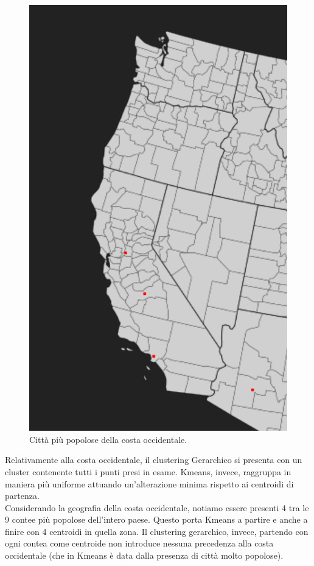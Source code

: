 \documentclass{article}
\begin{document}
\begin{figure}
	\vspace*{-0.5cm}
	\centering
	\includegraphics[width=1.0\linewidth]{figures/costa_bis}
	\caption*{Città più popolose della costa occidentale.}
\end{figure}
Relativamente alla costa occidentale, il clustering Gerarchico si presenta con un cluster contenente tutti i punti presi in esame. Kmeans, invece, raggruppa in maniera più uniforme attuando un'alterazione minima rispetto ai centroidi di partenza.\\
Considerando la geografia della costa occidentale, notiamo essere presenti 4 tra le 9 contee più popolose dell'intero paese.
Questo porta Kmeans a partire e anche a finire con 4 centroidi in quella zona.
Il clustering gerarchico, invece, partendo con ogni contea come centroide non introduce nessuna precedenza alla costa occidentale (che in Kmeans è data dalla presenza di città molto popolose).\\
\end{document}
